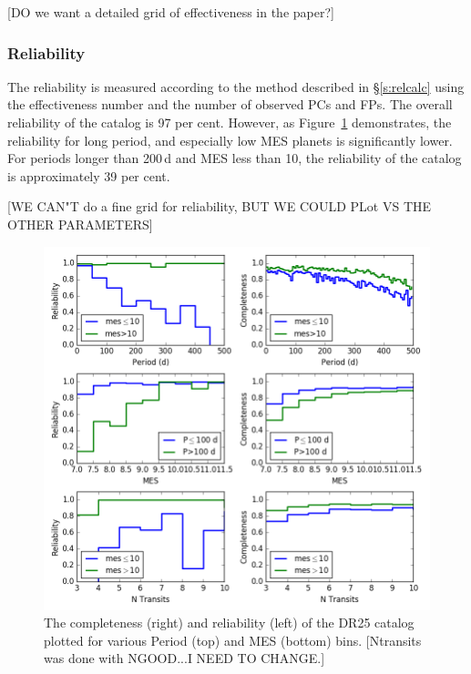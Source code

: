 [DO we want a detailed grid of effectiveness in the paper?]

\subsubsection{Reliability}
The reliability is measured according to the method described in \S\ref{s:relcalc} using the effectiveness number and the number of observed PCs and FPs.  The overall reliability of the catalog is 97 per cent. However, as Figure~\ref{f:1dcompare} demonstrates, the reliability for long period, and especially low MES planets is significantly lower.  For periods longer than 200\,d and MES less than 10, the reliability of the catalog is approximately 39 per cent.

[WE CAN"T do a fine grid for reliability, BUT WE COULD PLot VS THE  OTHER PARAMETERS]

\begin{figure}[h!]
 \begin{center}
  \includegraphics[width=1.0\linewidth]{fig-compRel1D-PerMes.png}
  \caption{ The completeness (right) and reliability (left) of the DR25 catalog plotted for various Period (top) and MES (bottom) bins. [Ntransits was done with NGOOD...I NEED TO CHANGE.] }
  \label{f:1dcompare}
 \end{center}
 \end{figure}




